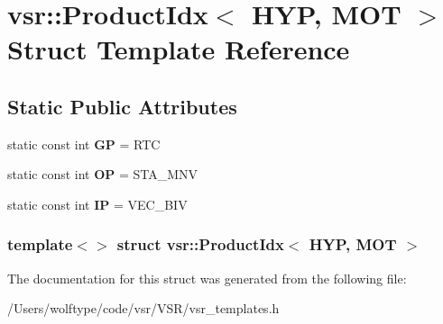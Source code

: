 \hypertarget{structvsr_1_1_product_idx_3_01_h_y_p_00_01_m_o_t_01_4}{\section{vsr\-:\-:Product\-Idx$<$ H\-Y\-P, M\-O\-T $>$ Struct Template Reference}
\label{structvsr_1_1_product_idx_3_01_h_y_p_00_01_m_o_t_01_4}
}
\subsection*{Static Public Attributes}
\begin{DoxyCompactItemize}
\item 
\hypertarget{structvsr_1_1_product_idx_3_01_h_y_p_00_01_m_o_t_01_4_a42d4cea8e9e67584fd08198de0ad8895}{static const int {\bfseries G\-P} = R\-T\-C}\label{structvsr_1_1_product_idx_3_01_h_y_p_00_01_m_o_t_01_4_a42d4cea8e9e67584fd08198de0ad8895}

\item 
\hypertarget{structvsr_1_1_product_idx_3_01_h_y_p_00_01_m_o_t_01_4_a96633de0cfbab120fb9145c7258138ce}{static const int {\bfseries O\-P} = S\-T\-A\-\_\-\-M\-N\-V}\label{structvsr_1_1_product_idx_3_01_h_y_p_00_01_m_o_t_01_4_a96633de0cfbab120fb9145c7258138ce}

\item 
\hypertarget{structvsr_1_1_product_idx_3_01_h_y_p_00_01_m_o_t_01_4_aa34d529207a37f1ebd0f1ad4a41787fa}{static const int {\bfseries I\-P} = V\-E\-C\-\_\-\-B\-I\-V}\label{structvsr_1_1_product_idx_3_01_h_y_p_00_01_m_o_t_01_4_aa34d529207a37f1ebd0f1ad4a41787fa}

\end{DoxyCompactItemize}
\subsubsection*{template$<$$>$ struct vsr\-::\-Product\-Idx$<$ H\-Y\-P, M\-O\-T $>$}



The documentation for this struct was generated from the following file\-:\begin{DoxyCompactItemize}
\item 
/\-Users/wolftype/code/vsr/\-V\-S\-R/vsr\-\_\-templates.\-h\end{DoxyCompactItemize}
